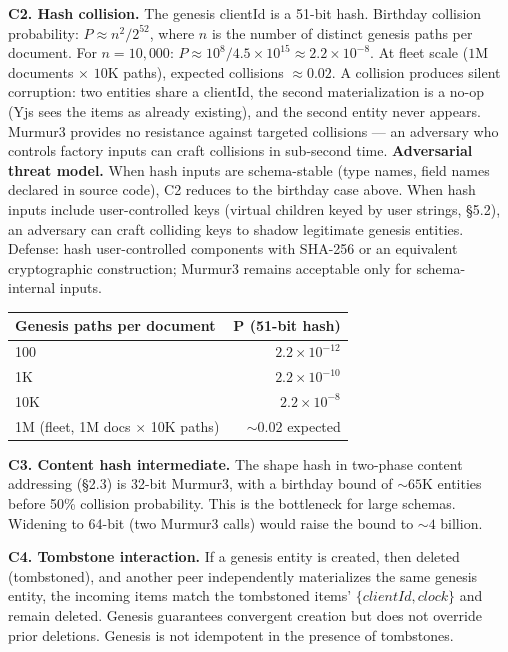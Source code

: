 \textbf{C2. Hash collision.} The genesis clientId is a 51-bit hash. Birthday collision probability: $P \approx n^2 / 2^{52}$, where $n$ is the number of distinct genesis paths per document. For $n = 10{,}000$: $P \approx 10^8 / 4.5 \times 10^{15} \approx 2.2 \times 10^{-8}$. At fleet scale ($1\text{M}$ documents $\times$ $10\text{K}$ paths), expected collisions $\approx 0.02$. A collision produces silent corruption: two entities share a clientId, the second materialization is a no-op (Yjs sees the items as already existing), and the second entity never appears. Murmur3 provides no resistance against targeted collisions --- an adversary who controls factory inputs can craft collisions in sub-second time. \textbf{Adversarial threat model.} When hash inputs are schema-stable (type names, field names declared in source code), C2 reduces to the birthday case above. When hash inputs include user-controlled keys (virtual children keyed by user strings, \S5.2), an adversary can craft colliding keys to shadow legitimate genesis entities. Defense: hash user-controlled components with SHA-256 or an equivalent cryptographic construction; Murmur3 remains acceptable only for schema-internal inputs.

\begin{center}
\begin{tabular}{@{}lr@{}}
\toprule
\textbf{Genesis paths per document} & \textbf{P (51-bit hash)} \\
\midrule
100 & $2.2 \times 10^{-12}$ \\
1K & $2.2 \times 10^{-10}$ \\
10K & $2.2 \times 10^{-8}$ \\
1M (fleet, 1M docs $\times$ 10K paths) & ${\sim}0.02$ expected \\
\bottomrule
\end{tabular}
\end{center}

\textbf{C3. Content hash intermediate.} The shape hash in two-phase content addressing (\S2.3) is 32-bit Murmur3, with a birthday bound of ${\sim}65\text{K}$ entities before 50\% collision probability. This is the bottleneck for large schemas. Widening to 64-bit (two Murmur3 calls) would raise the bound to ${\sim}4$ billion.

\textbf{C4. Tombstone interaction.} If a genesis entity is created, then deleted (tombstoned), and another peer independently materializes the same genesis entity, the incoming items match the tombstoned items' $\{\mathit{clientId}, \mathit{clock}\}$ and remain deleted. Genesis guarantees convergent creation but does not override prior deletions. Genesis is not idempotent in the presence of tombstones.

